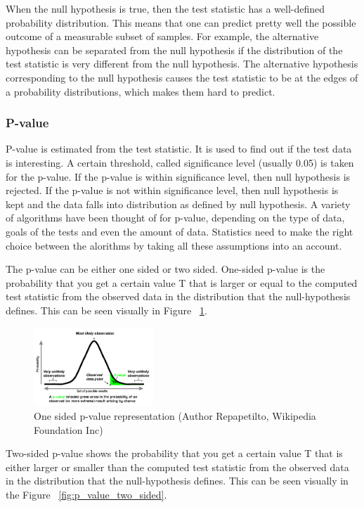 \documentclass[12pt]{article}
\begin{document}
When the null hypothesis is true, then the test statistic has a well-defined probability distribution. This means that one can predict pretty well the possible outcome of a measurable subset of samples. For example, the alternative hypothesis can be separated from the null hypothesis if the distribution of the test statistic is very different from the null hypothesis. The alternative hypothesis corresponding to the null hypothesis causes the test statistic to be at the edges of a probability distributions, which makes them hard to predict.

\subsubsection{P-value}
P-value is estimated from the test statistic. It is used to find out if the test data is interesting. A certain threshold, called significance level (usually 0.05) is taken for the p-value. If the p-value is within significance level, then null hypothesis is rejected. If the p-value is not within significance level, then null hypothesis is kept and the data falls into distribution as defined by null hypothesis. A variety of algorithms have been thought of for p-value, depending on the type of data, goals of the tests and even the amount of data. Statistics need to make the right choice between the alorithms by taking all these assumptions into an account.

The p-value can be either one sided or two sided. One-sided p-value is the probability that you get a certain value T that is larger or equal to the computed test statistic from the observed data in the distribution that the null-hypothesis defines. This can be seen visually in Figure ~\ref{fig:p_value_one_sided}.

\begin{figure}[!ht]
  \centering
  \includegraphics[width=0.4\textwidth]{p_value_one_sided}
  \caption{One sided p-value representation (Author Repapetilto, Wikipedia Foundation Inc)}
  \label{fig:p_value_one_sided}
\end{figure}

Two-sided p-value shows the probability that you get a certain value T that is either larger or smaller than the computed test statistic from the observed data in the distribution that the null-hypothesis defines. This can be seen visually in the Figure ~\ref{fig:p_value_two_sided}.
\end{document}
